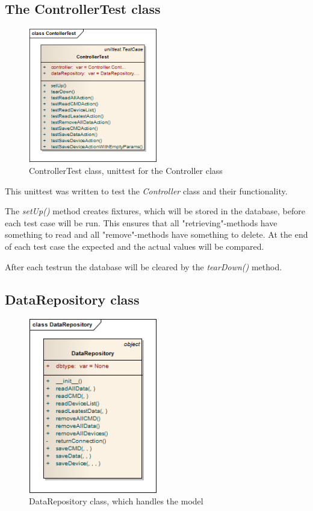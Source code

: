 \subsection{The ControllerTest class}
\begin{figure}[H]
   \centering
   \includegraphics[width=0.5\textwidth]{pic/ControllerTest.png}%
   \caption{ControllerTest class, unittest for the Controller class}
   \label{ControllerTestpic}%
\end{figure}

This unittest was written to test the \textit{Controller} class and their functionality. 

The \textit{setUp()} method creates fixtures, which will be stored in the database, before each test case will be run. This ensures that all "retrieving"-methods have something to read and all "remove"-methods have something to delete. At the end of each test case the expected and the actual values will be compared. 

After each testrun the database will be cleared by the \textit{tearDown()} method. 

\newpage
\subsection{DataRepository class}
\begin{figure}[H]
   \centering
   \includegraphics[width=0.5\textwidth]{pic/DataRepository.png}%
   \caption{DataRepository class, which handles the model}
   \label{DataRepositorypic}%
\end{figure}

